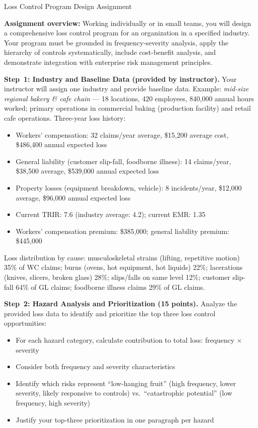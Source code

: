 \documentclass[11pt,openany]{book}
\providecommand{\tightlist}{\setlength{\itemsep}{0pt}\setlength{\parskip}{0pt}}
\begin{document}
\begin{minicase}{Loss Control Program Design Assignment}

\textbf{Assignment overview:} Working individually or in small teams, you will
design a comprehensive loss control program for an organization in a specified
industry. Your program must be grounded in frequency-severity analysis, apply
the hierarchy of controls systematically, include cost-benefit analysis, and
demonstrate integration with enterprise risk management principles.

\medskip
\textbf{Step~1: Industry and Baseline Data (provided by instructor).} Your
instructor will assign one industry and provide baseline data. Example:
\emph{mid-size regional bakery \& cafe chain} --- 18 locations, 420 employees,
840{,}000 annual hours worked; primary operations in commercial baking
(production facility) and retail cafe operations. Three-year loss history:

\begin{itemize}\tightlist
  \item Workers' compensation: 32 claims/year average, \$15{,}200 average
        cost, \$486{,}400 annual expected loss
  \item General liability (customer slip-fall, foodborne illness): 14
        claims/year, \$38{,}500 average, \$539{,}000 annual expected loss
  \item Property losses (equipment breakdown, vehicle): 8 incidents/year,
        \$12{,}000 average, \$96{,}000 annual expected loss
  \item Current TRIR: 7.6 (industry average: 4.2); current EMR: 1.35
  \item Workers' compensation premium: \$385{,}000; general liability premium:
        \$445{,}000
\end{itemize}

Loss distribution by cause: musculoskeletal strains (lifting, repetitive
motion) 35\% of WC claims; burns (ovens, hot equipment, hot liquids) 22\%;
lacerations (knives, slicers, broken glass) 28\%; slips/falls on same level
12\%; customer slip-fall 64\% of GL claims; foodborne illness claims 29\% of
GL claims.

\medskip
\textbf{Step~2: Hazard Analysis and Prioritization (15 points).} Analyze the
provided loss data to identify and prioritize the top three loss control
opportunities:
\begin{itemize}\tightlist
  \item For each hazard category, calculate contribution to total loss:
        frequency \(\times\) severity
  \item Consider both frequency and severity characteristics
  \item Identify which risks represent ``low-hanging fruit'' (high frequency,
        lower severity, likely responsive to controls) vs.\ ``catastrophic
        potential'' (low frequency, high severity)
  \item Justify your top-three prioritization in one paragraph per hazard
\end{itemize}


\end{minicase}
\end{document}
